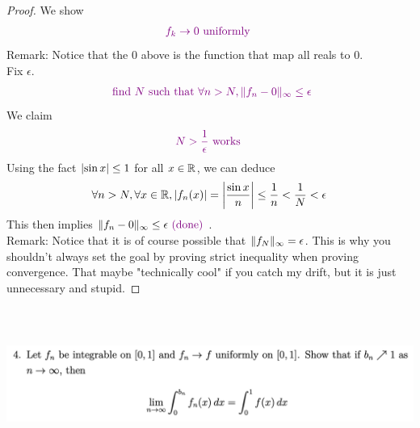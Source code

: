 \documentclass{report}
\begin{document}
\begin{proof}
We show 
\begin{align*}
\textcolor{violet}{f_k\to 0\text{ uniformly }}
\end{align*}
Remark: Notice that the $0$ above is the function that map all reals to $0$.\\

Fix $\epsilon $. 
\begin{align*}
\textcolor{violet}{\text{ find $N$ such that }\forall n>N, \| f_n-0 \|_\infty \leq \epsilon }
\end{align*}
We claim 
\begin{align*}
  \textcolor{violet}{N>\frac{1}{\epsilon }\text{ works }}
\end{align*}
Using the fact $\left|\sin x\right|\leq 1$ for all $x \in\mathbb{R}$, we can deduce 
\begin{align*}
\forall n>N, \forall x\in\mathbb{R}, \left|f_n(x)\right|=\left|\frac{\sin x}{n}\right|\leq \frac{1}{n}<\frac{1}{N}< \epsilon 
\end{align*}
This then implies $\| f_n-0 \|_{\infty}\leq \epsilon\textcolor{violet}{\text{ (done) }} $.\\

Remark: Notice that it is of course possible that $\| f_N \|_\infty=\epsilon $. This is why you shouldn't always set the goal by proving strict inequality when proving convergence. That maybe "technically cool" if you catch my drift, but it is just unnecessary and stupid. 
\end{proof}
\begin{question}{}{}
\includegraphics[height=5cm,width=18cm]{HW1.4}
\end{question}
\end{document}
